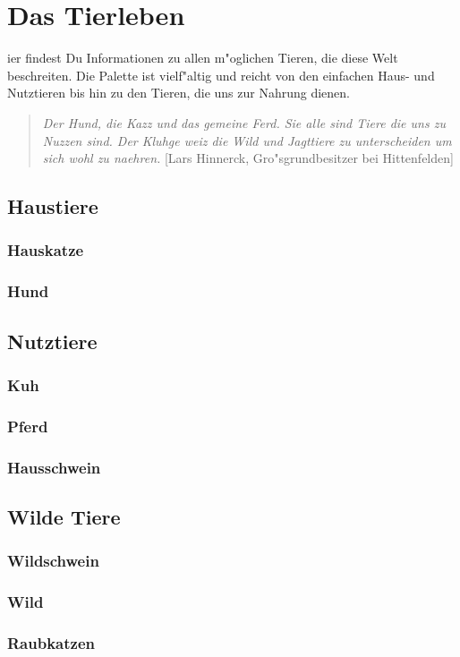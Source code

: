 \chapter{Das Tierleben}
\label{tierleben}

ier findest Du Informationen zu allen m"oglichen Tieren, die
diese Welt beschreiten. Die Palette ist vielf"altig und reicht von
den einfachen Haus- und Nutztieren bis hin zu den Tieren, die uns
zur Nahrung dienen.
\begin{quotation}
\par\textit{\glqq Der Hund, die Kazz und das gemeine Ferd. Sie alle sind Tiere die uns zu Nuzzen sind. Der Kluhge weiz die Wild und Jagttiere zu unterscheiden um sich wohl zu naehren. \grqq} [\mbox{Lars} \mbox{Hinnerck}, Gro"sgrundbesitzer bei Hittenfelden]
\end{quotation}

\section{Haustiere}

\subsection{Hauskatze}

\subsection{Hund}

\section{Nutztiere}

\subsection{Kuh}

\subsection{Pferd}

\subsection{Hausschwein}

\section{Wilde Tiere}

\subsection{Wildschwein}

\subsection{Wild}

\subsection{Raubkatzen}
